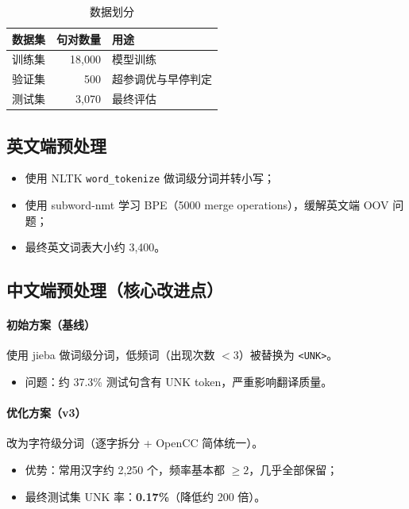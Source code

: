 \documentclass[12pt, a4paper]{ctexart}
\begin{document}
\begin{table}[H]
\centering
\caption{数据划分}
\begin{tabular}{lrl}
\toprule
\textbf{数据集} & \textbf{句对数量} & \textbf{用途} \\
\midrule
训练集 & 18,000 & 模型训练 \\
验证集 & 500    & 超参调优与早停判定 \\
测试集 & 3,070  & 最终评估 \\
\bottomrule
\end{tabular}
\end{table}

\subsection{英文端预处理}

\begin{itemize}[nosep]
  \item 使用 NLTK \texttt{word\_tokenize} 做词级分词并转小写；
  \item 使用 subword-nmt 学习 BPE（5000 merge operations），缓解英文端 OOV 问题；
  \item 最终英文词表大小约 3,400。
\end{itemize}

\subsection{中文端预处理（核心改进点）}

\paragraph{初始方案（基线）}
使用 jieba 做词级分词，低频词（出现次数 $<3$）被替换为 \texttt{<UNK>}。
\begin{itemize}[nosep]
  \item 问题：约 37.3\% 测试句含有 UNK token，严重影响翻译质量。
\end{itemize}

\paragraph{优化方案（v3）}
改为字符级分词（逐字拆分 + OpenCC 简体统一）。
\begin{itemize}[nosep]
  \item 优势：常用汉字约 2,250 个，频率基本都 $\geq 2$，几乎全部保留；
  \item 最终测试集 UNK 率：\textbf{0.17\%}（降低约 200 倍）。
\end{itemize}
\end{document}
